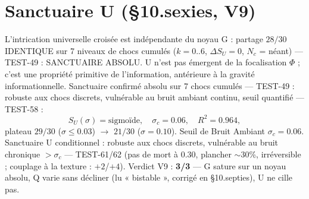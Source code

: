 \documentclass[11pt,a4paper]{article}
\begin{document}
\section{Sanctuaire U (§10.sexies, V9)}
L'intrication universelle croisée est indépendante du noyau G :
partage $28/30$ IDENTIQUE sur 7 niveaux de chocs cumulés ($k = 0..6$,
$\Delta S_U = 0$, $N_c$ = néant) --- TEST-49 : SANCTUAIRE ABSOLU.
U n'est pas émergent de la focalisation $\Phi$ ; c'est une propriété
primitive de l'information, antérieure à la gravité informationnelle.
Sanctuaire confirmé absolu sur 7 chocs cumulés --- TEST-49 : robuste
aux chocs discrets, vulnérable au bruit ambiant continu, seuil
quantifié --- TEST-58 :
\begin{equation}
S_U(\sigma) = \mathrm{sigmoïde},\quad \sigma_c = 0.06,\quad R^2 = 0.964,
\end{equation}
plateau $29/30$ ($\sigma \le 0.03$) $\to$ $21/30$ ($\sigma = 0.10$).
Seuil de Bruit Ambiant $\sigma_c = 0.06$. Sanctuaire U conditionnel :
robuste aux chocs discrets, vulnérable au bruit chronique $> \sigma_c$
--- TEST-61/62 (pas de mort à $0.30$, plancher $\sim 30$\%,
irréversible ; couplage à la texture : $+2$/$+4$).
Verdict V9 : \textbf{3/3} — G sature sur un noyau absolu, Q varie
sans décliner (lu « bistable », corrigé en §10.septies), U ne cille pas.
\end{document}
